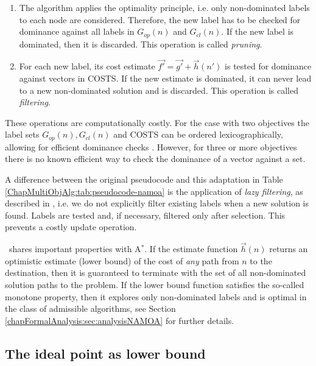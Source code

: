 \begin{enumerate}
	\item The algorithm applies the optimality principle, i.e. only non-dominated labels to each node are considered. Therefore, the new label has to be checked for dominance against all labels in $G_{op}(n)$ and $G_{cl}(n)$. If the new label is dominated, then it is discarded. This operation is called \emph{pruning}.
	\item For each new label, its cost estimate $\vec{f'} = \vec{g'} + \vec  h(n')$ is tested for dominance against vectors in COSTS. If the new estimate is dominated, it can never lead to a new non-dominated solution and is discarded. This operation is called \emph{filtering}.
\end{enumerate}

These operations are computationally costly. For the case with two objectives the label sets $G_{op}(n), G_{cl}(n)$ and COSTS can be ordered lexicographically, allowing for efficient dominance checks \citep{SandersMandow2013}. However, for three or more objectives there is no known efficient way to check the dominance of a vector against a set. 

A difference between the original pseudocode and this adaptation in Table \ref{ChapMultiObjAlg:tab:pseudocode-namoa} is the application of \textit{lazy filtering}, as described in \citep{SandersMandow2013}, i.e. we do not explicitly filter existing labels when a new solution is found. Labels are tested and, if necessary, filtered only after selection. This prevents a costly update operation.

\namoa \ shares important properties with A$^*$. If the estimate function $\vec h(n)$ returns an optimistic estimate (lower bound) of the cost of \emph{any} path from $n$ to the destination, then it is guaranteed to terminate with the set of all non-dominated solution paths to the problem. If the lower bound function satisfies the so-called monotone property, then it explores only non-dominated labels and is optimal in the class of admissible algorithms, see Section \ref{chapFormalAnalysis:sec:analysisNAMOA} for further details. 

\subsection{The ideal point as lower bound}
\label{chapMultiObjAlg:subsec:tc}


